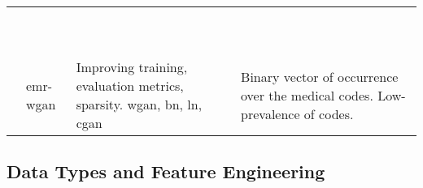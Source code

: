 \begin{sidewaystable}[htbp]
\begin{tabularx}{\textwidth}{@{}p{4cm}XXX@{}}
            
            \cite{chincheong2020generation}
            & 
            & 
            &\\
            
            \cite{yan2020generating}
            & 
            & 
            &\\
            
            \cite{ozyigit2020generation}
            & 
            & 
            &\\
            
            \cite{walsh2020generating}
            & 
            & 
            &\\
            
            \cite{Rankin2020}
            & 
            & 
            &\\
            
            \cite{Zhang2020}
            & 
            & 
            &\\
            
            \cite{Yoon2020-anon}
            & 
            & 
            &\\
            
            \cite{BaeAnomiGAN2020}
            & 
            & 
            &\\
            
            \cite{Goncalves2020}
            & 
            & 
            &\\
            
            \cite{chen2019ganleaks}
            & 
            & 
            &\\
            
            \cite{Zhang2020}
            &\gls{emr-wgan}
            & Improving training, evaluation metrics, sparsity. \gls{wgan}, \gls{bn}, \gls{ln}, \gls{cgan}
            & Binary vector of occurrence over the medical codes. Low-prevalence of codes. \\
            
            \bottomrule
        \end{tabularx}
    \end{sidewaystable}

    \subsection{Data Types and Feature Engineering}

